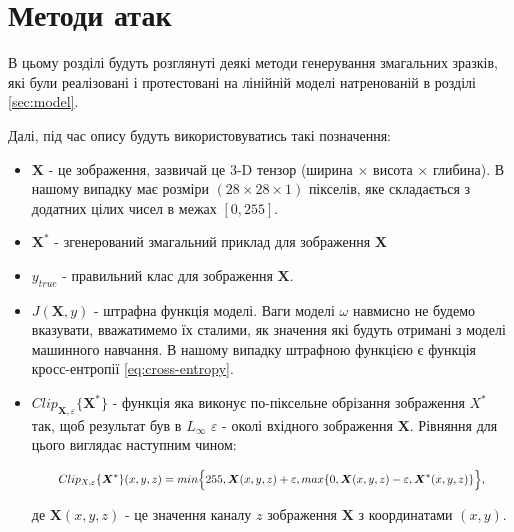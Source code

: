 \documentclass[a4paper,14pt]{extreport}
\begin{document}
	
	\chapter{Методи атак}
	В цьому розділі будуть розглянуті деякі методи генерування змагальних зразків, які були реалізовані і протестовані на лінійній моделі натренованій в розділі \ref{sec:model}.
	
	Далі, під час опису будуть використовуватись такі позначення:
	\begin{itemize}
		\item $\boldsymbol{X}$ - це зображення, зазвичай це 3-D тензор (ширина $\times$ висота $\times$ глибина). В нашому випадку має розміри $(28 \times 28 \times 1)$ пікселів, яке складається з додатних цілих чисел в межах $[0, 255]$.
		\item $\boldsymbol{X}^{*}$ - згенерований змагальний приклад для зображення $\boldsymbol{X}$
		\item $y_{true}$ - правильний клас для зображення $\boldsymbol{X}$.
		\item $J(\boldsymbol{X}, y)$ - штрафна функція моделі. Ваги моделі $\omega$ навмисно не будемо вказувати, вважатимемо їх сталими, як значення які будуть отримані з моделі машинного навчання. В нашому випадку штрафною функцією є функція кросс-ентропії \ref{eq:cross-entropy}. 
		\item $Clip_{\boldsymbol{X}, \varepsilon} \{ \boldsymbol{X}^{*} \}$ - функція яка виконує по-піксельне обрізання зображення $X^{*}$ так, щоб результат був в $L_{\infty}$ $\varepsilon $ - околі вхідного зображення $\boldsymbol{X}$. Рівняння для цього виглядає наступним чином:
		
		\begingroup
		\setlength{\abovedisplayskip}{0pt}
		\setlength{\belowdisplayskip}{0pt}
		\begin{align}
		\label{eq:clip}
		\resizebox{.9 \textwidth}{!} 
		{
			$
			Clip_{X, \varepsilon} \{ \boldsymbol{X}^{*} \}(x, y, z) = 
			min\Big\{ 255, \boldsymbol{X}(x, y, z) + \varepsilon, max \{ 0, \boldsymbol{X}(x, y, z) - \varepsilon, \boldsymbol{X}^{*}(x, y, z) \} \Big\}
			$,
		}
		\end{align}
		\endgroup

		де $\boldsymbol{X}(x, y, z)$ - це значення каналу $z$ зображення $\boldsymbol{X}$ з координатами $(x, y)$.
	\end{itemize}
\end{document}

